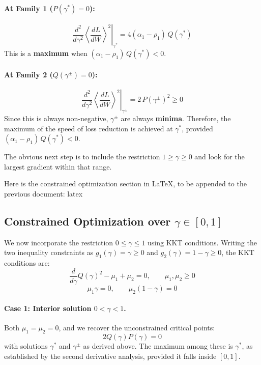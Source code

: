 \documentclass[12pt]{article}
\begin{document}
\paragraph{At Family 1 ($P(\gamma^*) = 0$):}
\begin{equation}
    \left.\frac{d^2}{d\gamma^2}\left\langle \frac{dL}{dW} \right\rangle^2\right|_{\gamma^*} = 4(\alpha_1 - \rho_1)\,Q(\gamma^*)
\end{equation}
This is a \textbf{maximum} when $(\alpha_1 - \rho_1)\,Q(\gamma^*) < 0$.

\paragraph{At Family 2 ($Q(\gamma^\pm) = 0$):}
\begin{equation}
    \left.\frac{d^2}{d\gamma^2}\left\langle \frac{dL}{dW} \right\rangle^2\right|_{\gamma^\pm} = 2\,P(\gamma^\pm)^2 \geq 0
\end{equation}
Since this is always non-negative, $\gamma^\pm$ are always \textbf{minima}. Therefore, the maximum
of the speed of loss reduction is achieved at $\gamma^*$, provided $(\alpha_1-\rho_1)\,Q(\gamma^*) < 0$.

The obvious next step is to include the restriction $1 \geq \gamma \geq 0$ and look for the largest gradient within that range.

Here is the constrained optimization section in LaTeX, to be appended to the previous document:
latex\subsection*{Constrained Optimization over $\gamma \in [0,1]$}

We now incorporate the restriction $0 \leq \gamma \leq 1$ using KKT conditions.
Writing the two inequality constraints as $g_1(\gamma) = \gamma \geq 0$ and
$g_2(\gamma) = 1 - \gamma \geq 0$, the KKT conditions are:
\begin{equation}
    \frac{d}{d\gamma}Q(\gamma)^2 - \mu_1 + \mu_2 = 0, \qquad \mu_1, \mu_2 \geq 0
\end{equation}
\begin{equation}
    \mu_1 \gamma = 0, \qquad \mu_2(1-\gamma) = 0
\end{equation}

\paragraph{Case 1: Interior solution $0 < \gamma < 1$.}
Both $\mu_1 = \mu_2 = 0$, and we recover the unconstrained critical points:
\begin{equation}
    2Q(\gamma)P(\gamma) = 0
\end{equation}
with solutions $\gamma^*$ and $\gamma^\pm$ as derived above. The maximum among
these is $\gamma^*$, as established by the second derivative analysis, provided
it falls inside $[0,1]$.
\end{document}
